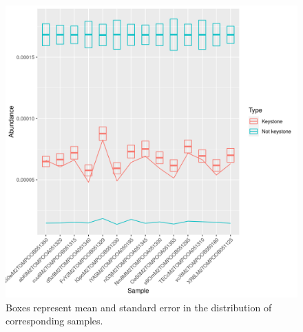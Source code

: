 \documentclass{article}
\begin{document}



\begin{figure}
 \centering
 \includegraphics[scale = 0.75]{mean_median_key_vs_not_key_tomate_desarrollo.csv.png}
\caption{Boxes represent mean and standard error in the distribution of corresponding samples.} %
\label{mean_median_tomate_desarrollo.csv}
\end{figure}
\end{document}
